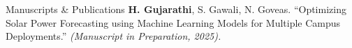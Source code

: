 
\begin{rSection}{Manuscripts \& Publications}
    \textbf{H. Gujarathi}, S. Gawali, N. Goveas. ``Optimizing Solar Power Forecasting using Machine Learning Models for Multiple Campus Deployments.'' \textit{(Manuscript in Preparation, 2025).}
\end{rSection}